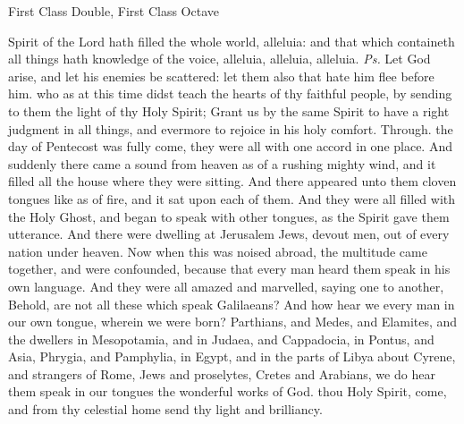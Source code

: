 \begin{inhead}
    {First Class Double, First Class Octave}
\end{inhead}
\par\noindent
{}


\introit
{} Spirit of the Lord hath filled the whole world, alleluia: and that which containeth all things hath knowledge of the voice, alleluia, alleluia, alleluia. \textit{Ps.} Let God arise, and let his enemies be scattered: let them also that hate him flee before him.
\collect
{} who as at this time didst teach the hearts of thy faithful people, by sending to them the light of thy Holy Spirit; Grant us by the same Spirit to have a right judgment in all things, and evermore to rejoice in his holy comfort. Through.
 the day of Pentecost was fully come, they were all with one accord in one place. And suddenly there came a sound from heaven as of a rushing mighty wind, and it filled all the house where they were sitting. And there appeared unto them cloven tongues like as of fire, and it sat upon each of them. And they were all filled with the Holy Ghost, and began to speak with other tongues, as the Spirit gave them utterance. And there were dwelling at Jerusalem Jews, devout men, out of every nation under heaven. Now when this was noised abroad, the multitude came together, and were confounded, because that every man heard them speak in his own language. And they were all amazed and marvelled, saying one to another, Behold, are not all these which speak Galilaeans? And how hear we every man in our own tongue, wherein we were born? Parthians, and Medes, and Elamites, and the dwellers in Mesopotamia, and in Judaea, and Cappadocia, in Pontus, and Asia, Phrygia, and Pamphylia, in Egypt, and in the parts of Libya about Cyrene, and strangers of Rome, Jews and proselytes, Cretes and Arabians, we do hear them speak in our tongues the wonderful works of God.
\label{WhitSeq}
 thou Holy Spirit, come, and from thy celestial home send thy light and brilliancy.

